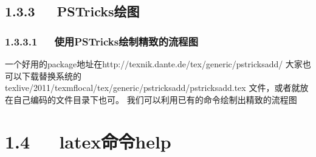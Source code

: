 \documentclass[letterpaper,12pt,english]{sphinxmanual}
\begin{document}
\subsection{1.3.3   PSTricks绘图}
\label{\detokenize{001software/001install/LaTex:pstricks}}

\subsubsection{1.3.3.1   使用PSTricks绘制精致的流程图}
\label{\detokenize{001software/001install/LaTex:id5}}
一个好用的package地址在http://texnik.dante.de/tex/generic/pstricks\sphinxhyphen{}add/  大家也可以下载替换系统的 texlive/2011/texmf\sphinxhyphen{}local/tex/generic/pstricks\sphinxhyphen{}add/pstricks\sphinxhyphen{}add.tex 文件，或者就放在自己编码的文件目录下也可。
我们可以利用已有的命令绘制出精致的流程图


\section{1.4   latex命令help}
\label{\detokenize{001software/001install/LaTex:latexhelp}}
\end{document}
